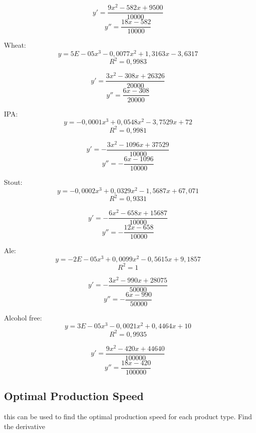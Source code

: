 \[y' = \frac{9x^2-582x+9500}{10000}\]
\[y'' = \frac{18x-582}{10000}\]

Wheat:\\
\[y = 5E-05x^3 - 0,0077x^2 + 1,3163x - 3,6317\]
\[R^2 = 0,9983\]

\[y' = \frac{3x^2-308x+26326}{20000}\]
\[y'' = \frac{6x-308}{20000}\]

IPA:\\
\[y = -0,0001x^3 + 0,0548x^2 - 3,7529x + 72\]
\[R^2 = 0,9981\]

\[y'=-\frac{3x^2-1096x+37529}{10000}\]
\[y''=-\frac{6x-1096}{10000}\]


Stout:\\
\[y = -0,0002x^3 + 0,0329x^2 - 1,5687x + 67,071\]
\[R^2 = 0,9331\]

\[y'=-\frac{6x^2-658x+15687}{10000}\]
\[y''=-\frac{12x-658}{10000}\]

Ale:\\
\[y = -2E-05x^3 + 0,0099x^2 - 0,5615x + 9,1857\]
\[R^2 = 1\]

\[y'=-\frac{3x^2-990x+28075}{50000}\]
\[y''=-\frac{6x-990}{50000}\]

Alcohol free:\\
\[y = 3E-05x^3 - 0,0021x^2 + 0,4464x + 10\]
\[R^2 = 0,9935\]

\[y'=\frac{9x^2-420x+44640}{100000}\]
\[y''=\frac{18x-420}{100000}\]

\subsection{Optimal Production Speed}







this can be used to find the optimal production speed for each product type. 
Find the derivative